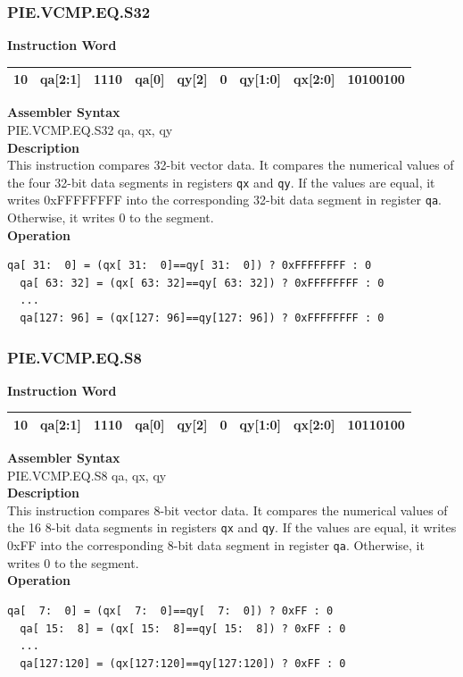 \newpage
\subsubsection{PIE.VCMP.EQ.S32}\label{instruction:PIEVCMPEQS32}
\setlength\tabcolsep{6pt}
\textbf{Instruction Word} \\
\begin{tabular}{|c|c|c|c|c|c|c|c|c|}
	\hline
	10 & qa[2:1] & 1110 & qa[0] & qy[2] & 0 & qy[1:0] & qx[2:0] & 10100100 \\
	\hline
\end{tabular}

\textbf{Assembler Syntax} \\
PIE.VCMP.EQ.S32 qa, qx, qy \\
\textbf{Description} \\
This instruction compares 32-bit vector data. It compares the numerical values of the four 32-bit data segments in registers \lstinline{qx} and \lstinline{qy}. If the values are equal, it writes 0xFFFFFFFF into the corresponding 32-bit data segment in register \lstinline{qa}. Otherwise, it writes 0 to the segment.\\
\textbf{Operation}
\begin{lstlisting}[escapeinside=`?]
  qa[ 31:  0] = (qx[ 31:  0]==qy[ 31:  0]) ? 0xFFFFFFFF : 0
  qa[ 63: 32] = (qx[ 63: 32]==qy[ 63: 32]) ? 0xFFFFFFFF : 0
  ...
  qa[127: 96] = (qx[127: 96]==qy[127: 96]) ? 0xFFFFFFFF : 0
\end{lstlisting}

\newpage
\subsubsection{PIE.VCMP.EQ.S8}\label{instruction:PIEVCMPEQS8}
\setlength\tabcolsep{6pt}
\textbf{Instruction Word} \\
\begin{tabular}{|c|c|c|c|c|c|c|c|c|}
	\hline
	10 & qa[2:1] & 1110 & qa[0] & qy[2] & 0 & qy[1:0] & qx[2:0] & 10110100 \\
	\hline
\end{tabular}

\textbf{Assembler Syntax} \\
PIE.VCMP.EQ.S8 qa, qx, qy \\
\textbf{Description} \\
This instruction compares 8-bit vector data. It compares the numerical values of the 16 8-bit data segments in registers \lstinline{qx} and \lstinline{qy}. If the values are equal, it writes 0xFF into the corresponding 8-bit data segment in register \lstinline{qa}. Otherwise, it writes 0 to the segment.\\
\textbf{Operation}
\begin{lstlisting}[escapeinside=`?]
  qa[  7:  0] = (qx[  7:  0]==qy[  7:  0]) ? 0xFF : 0
  qa[ 15:  8] = (qx[ 15:  8]==qy[ 15:  8]) ? 0xFF : 0
  ...
  qa[127:120] = (qx[127:120]==qy[127:120]) ? 0xFF : 0
\end{lstlisting}

